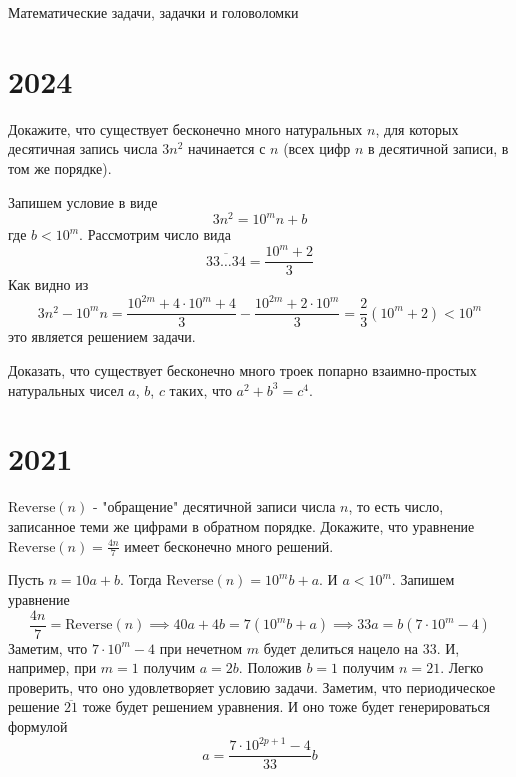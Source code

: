 \documentclass[11pt, a4paper]{template}
\begin{document}
\begin{titlepage}
  \begin{center}
	\Huge{Математические задачи, задачки и головоломки}
  \end{center}
\end{titlepage}

\chapter{2024}

\begin{exercise}
Докажите, что существует бесконечно много натуральных $n$, для которых десятичная запись числа $3n^2$ начинается с $n$ (всех цифр $n$ в десятичной записи, в том же порядке).
\end{exercise}

\begin{solution}
Запишем условие в виде
$$
3n^{2} = 10^{m} n + b
$$
где $b < 10^{m}$. Рассмотрим число вида 
$$
\overline{33\dots 34} = \frac{10^{m} + 2}{3} 
$$
Как видно из
$$
3n^{2} - 10^{m}n = \frac{10^{2m} + 4 \cdot 10^{m} + 4}{3} - \frac{10^{2m} + 2 \cdot 10^{m}}{3} = \frac{2}{3}(10^{m} + 2) < 10^{m}
$$
это является решением задачи. 
\end{solution}

\begin{exercise}
Доказать, что существует бесконечно много троек попарно взаимно-простых натуральных чисел $a$, $b$, $c$ таких, что $a^{2} + b^{3} = c^{4}$.
\end{exercise}


\chapter{2021}

\begin{exercise}
$\text{Reverse}(n)$ - "обращение" десятичной записи числа $n$, то есть число, записанное теми же цифрами в обратном порядке. Докажите, что уравнение $\text{Reverse}(n) = \frac{4n}{7}$ имеет бесконечно много решений.
\end{exercise}

\begin{solution}
Пусть $n = 10a + b$. Тогда $\text{Reverse}(n) = 10^{m} b + a$. И $a < 10^{m}$. Запишем уравнение
$$
\frac{4n}{7} = \text{Reverse}(n) \implies 40a + 4b = 7(10^{m}b + a) \implies 33a = b(7 \cdot 10^{m} - 4)
$$
Заметим, что $7 \cdot 10^{m} - 4$ при нечетном $m$ будет делиться нацело на 33. И, например, при $m = 1$ получим $a = 2b$. Положив $b = 1$ получим $n = 21$. Легко проверить, что оно удовлетворяет условию задачи. Заметим, что периодическое решение $\overline{21}$ тоже будет решением уравнения. И оно тоже будет генерироваться формулой
$$
a = \frac{7 \cdot 10^{2p + 1} - 4}{33} b
$$
\end{solution}
\end{document}
